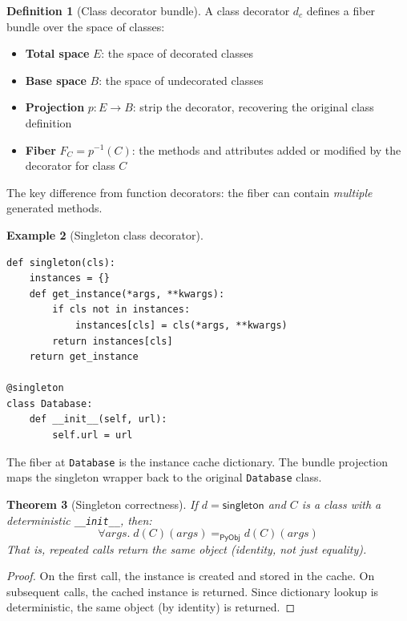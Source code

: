 \documentclass[11pt,a4paper]{report}
\theoremstyle{definition}
\newtheorem{definition}{Definition}[chapter]
\newtheorem{example}[definition]{Example}
\theoremstyle{plain}
\newtheorem{theorem}[definition]{Theorem}
\newcommand{\PyObj}{\mathsf{PyObj}}
\begin{document}
\begin{definition}[Class decorator bundle]
A class decorator $d_c$ defines a fiber bundle over the space of classes:
\begin{itemize}
  \item \textbf{Total space} $E$: the space of decorated classes
  \item \textbf{Base space} $B$: the space of undecorated classes
  \item \textbf{Projection} $p : E \to B$: strip the decorator, recovering the
    original class definition
  \item \textbf{Fiber} $F_C = p^{-1}(C)$: the methods and attributes added or
    modified by the decorator for class $C$
\end{itemize}
The key difference from function decorators: the fiber can contain \emph{multiple}
generated methods.
\end{definition}

\begin{example}[Singleton class decorator]
\begin{lstlisting}[style=python]
def singleton(cls):
    instances = {}
    def get_instance(*args, **kwargs):
        if cls not in instances:
            instances[cls] = cls(*args, **kwargs)
        return instances[cls]
    return get_instance
    
@singleton
class Database:
    def __init__(self, url):
        self.url = url
\end{lstlisting}

The fiber at \texttt{Database} is the instance cache dictionary. The bundle
projection maps the singleton wrapper back to the original \texttt{Database}
class.
\end{example}

\begin{theorem}[Singleton correctness]
\label{thm:singleton}
If $d = \mathsf{singleton}$ and $C$ is a class with a deterministic
\lstinline[style=python]|__init__|, then:
\[
  \forall \mathit{args}.\;
  d(C)(\mathit{args}) =_{\PyObj} d(C)(\mathit{args})
\]
That is, repeated calls return the same object (identity, not just equality).
\end{theorem}
\begin{proof}
On the first call, the instance is created and stored in the cache.
On subsequent calls, the cached instance is returned. Since dictionary
lookup is deterministic, the same object (by identity) is returned.
\end{proof}
\end{document}
